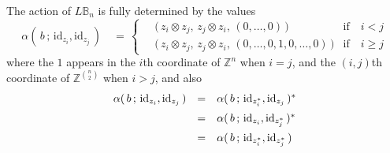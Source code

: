 \documentclass{amsbook} %
\newcommand{\id}{\textrm{id}}
\numberwithin{section}{chapter}
\begin{document}
\begin{prop} \label{invbraidact} The action of $L\mathbb{B}_n$ is fully determined by the values
\[ \alpha( \, b \, ; \, \id_{z_i}, \id_{z_j} \, ) \quad = \, 
		\begin{cases}
			\quad \big( \, z_i \otimes z_j, \, z_j \otimes z_i, \, (0, \ldots, 0) \, \big) & \text{if} \quad i < j \\
			\quad \big( \, z_i \otimes z_j, \, z_j \otimes z_i, \, (0,\ldots,0, 1, 0,\ldots,0) \, \big) & \text{if} \quad i \ge j
		\end{cases} 
\]
where the $1$ appears in the $i$th coordinate of $\mathbb{Z}^{n}$ when $i=j$, and the $(i,j)$th coordinate of $\mathbb{Z}^{{n}\choose{2}}$ when $i>j$, and also
\[ \begin{array}{rll} 
			\alpha( \, b \, ; \, \id_{z_i}, \id_{z_j} \, ) & = & \alpha( \, b \, ; \, \id_{z_i^*}, \id_{z_j} \, )^* \\[\medskipamount]
			& = & \alpha( \, b \, ; \, \id_{z_i}, \id_{z_j^*} \, )^* \\[\medskipamount]
			& = & \alpha( \, b \, ; \, \id_{z_i^*}, \id_{z_j^*} \, )
		\end{array}
\]
\end{prop}
\end{document}
